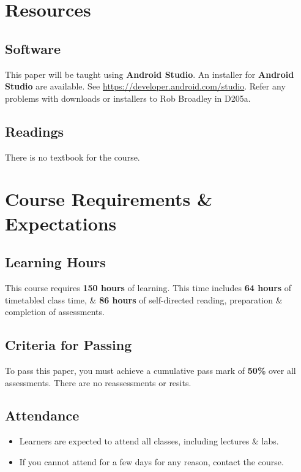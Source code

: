 \documentclass{article}
\begin{document}
\section*{Resources}

\subsection*{Software}
This paper will be taught using \textbf{Android Studio}. An installer for \textbf{Android Studio} are available. See \href{https://developer.android.com/studio/}{https://developer.android.com/studio}. Refer any problems with downloads or installers to Rob Broadley in D205a.

\subsection*{Readings}
There is no textbook for the course.

\section*{Course Requirements \& Expectations}

\subsection*{Learning Hours}
This course requires \textbf{150 hours} of learning. This time includes \textbf{64 hours} of timetabled class time, \& \textbf{86 hours} of self-directed reading, preparation \& completion of assessments.

\subsection*{Criteria for Passing}
To pass this paper, you must achieve a cumulative pass mark of \textbf{50\%} over all assessments. There are no reassessments or resits.

\subsection*{Attendance}
\begin{itemize}
	\item Learners are expected to attend all classes, including lectures \& labs.
	\item If you cannot attend for a few days for any reason, contact the course.
\end{itemize}
\end{document}
